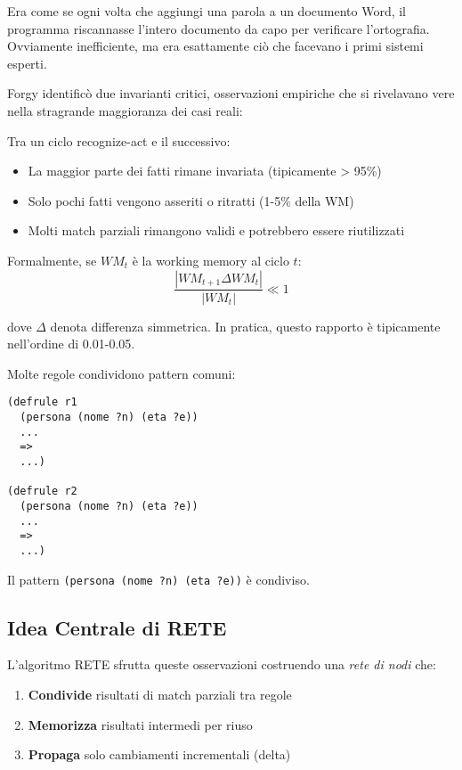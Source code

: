 Era come se ogni volta che aggiungi una parola a un documento Word, il programma riscannasse l'intero documento da capo per verificare l'ortografia. Ovviamente inefficiente, ma era esattamente ciò che facevano i primi sistemi esperti.

Forgy identificò due invarianti critici, osservazioni empiriche che si rivelavano vere nella stragrande maggioranza dei casi reali:

\begin{osservazione}
Tra un ciclo recognize-act e il successivo:
\begin{itemize}
\item La maggior parte dei fatti rimane invariata (tipicamente > 95\%)
\item Solo pochi fatti vengono asseriti o ritratti (1-5\% della WM)
\item Molti match parziali rimangono validi e potrebbero essere riutilizzati
\end{itemize}

Formalmente, se $WM_t$ è la working memory al ciclo $t$:
\begin{equation}
\frac{|WM_{t+1} \Delta WM_t|}{|WM_t|} \ll 1
\end{equation}

dove $\Delta$ denota differenza simmetrica. In pratica, questo rapporto è tipicamente nell'ordine di 0.01-0.05.
\end{osservazione}

\begin{osservazione}
Molte regole condividono pattern comuni:

\begin{lstlisting}[language=CLIPS]
(defrule r1
  (persona (nome ?n) (eta ?e))
  ...
  =>
  ...)

(defrule r2
  (persona (nome ?n) (eta ?e))
  ...
  =>
  ...)
\end{lstlisting}

Il pattern \texttt{(persona (nome ?n) (eta ?e))} è condiviso.
\end{osservazione}

\subsection{Idea Centrale di RETE}

L'algoritmo RETE sfrutta queste osservazioni costruendo una \textit{rete di nodi} che:

\begin{enumerate}
\item \textbf{Condivide} risultati di match parziali tra regole
\item \textbf{Memorizza} risultati intermedi per riuso
\item \textbf{Propaga} solo cambiamenti incrementali (delta)
\end{enumerate}

